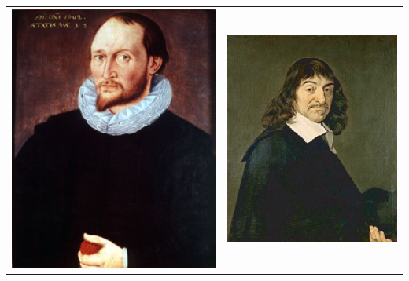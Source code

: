 \documentclass[letterpaper, 12pt]{article}
\begin{document}
\begin{center}
\begin{tabular}{c c}
\includegraphics[scale=0.25]{harriot.eps} & \includegraphics[scale=0.37]{Descartes.eps}\\

\end{tabular}
\end{center}
\end{document}
